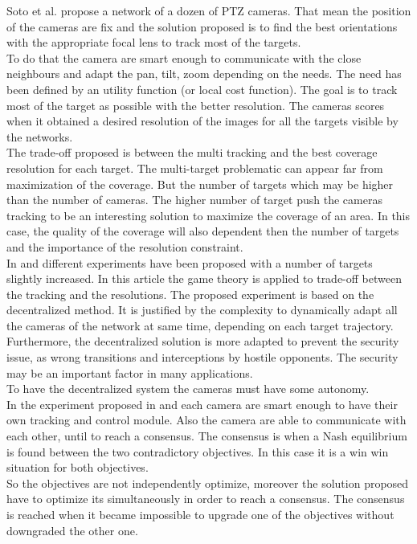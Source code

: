 Soto et al. \cite{12*soto2009} propose a network of a dozen of PTZ cameras. That mean the position of the cameras are fix and the solution proposed is to find the best orientations with the appropriate focal lens to track most of the targets.  \\
 To do that the camera are smart enough to communicate with the close neighbours and adapt the pan, tilt, zoom depending on the needs.
The need has been defined by an utility function (or local cost function). The goal is to track most of the target as possible with the better resolution. The cameras scores when it obtained a desired resolution of the images for all the targets visible by the networks.\\
The trade-off proposed is between the multi tracking and the best coverage resolution for each target. The multi-target problematic can appear far from maximization of the coverage. But the number of targets which may be higher than the number of cameras. The higher number of target push the cameras tracking to be an interesting solution to maximize the coverage of an area. In this case, the quality of the coverage will also dependent then the number of targets and the importance of the resolution constraint.  \\
	 In \cite{18*ding2012} and \cite{25*song2008} different experiments have been proposed with a number of targets  slightly increased. In this article the game theory is applied to trade-off between the tracking and the resolutions. The proposed experiment is based on the decentralized method. It is justified by the complexity to dynamically adapt all the cameras of the network at same time, depending on each target trajectory.\\
	  Furthermore, the decentralized solution is more adapted to prevent the security issue, as wrong transitions and interceptions by hostile opponents. The security may be an important factor in many applications. \\
To have the decentralized system the cameras must have some autonomy. \\
In the experiment proposed in \cite{12*soto2009} and \cite{18*ding2012,25*song2008} each camera are smart enough to have their own tracking and control module. Also the camera are able to communicate with each other, until to reach a consensus. The consensus is when a Nash equilibrium is found between the two contradictory objectives. In this case it is a win win situation for both objectives.\\
So the objectives are not independently optimize, moreover the solution proposed have to optimize its  simultaneously in order to reach a consensus. The consensus is reached when it became impossible to upgrade one of the objectives without downgraded the other one.\\

